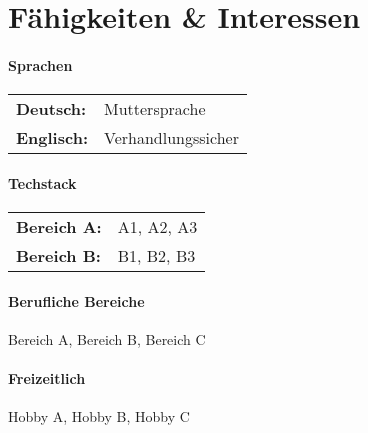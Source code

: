 \section{Fähigkeiten \& Interessen}

\paragraph{Sprachen}
\begin{tabular}{@{}>{\bfseries}ll}
    Deutsch:       & Muttersprache \\
    Englisch:      & Verhandlungssicher
\end{tabular}

\paragraph{Techstack}
\begin{tabular}{@{}>{\bfseries}ll}
    Bereich A:       & A1, A2, A3 \\
    Bereich B:       & B1, B2, B3 \\
\end{tabular}

\paragraph{Berufliche Bereiche}
Bereich A, Bereich B, Bereich C

\paragraph{Freizeitlich}
Hobby A, Hobby B, Hobby C
